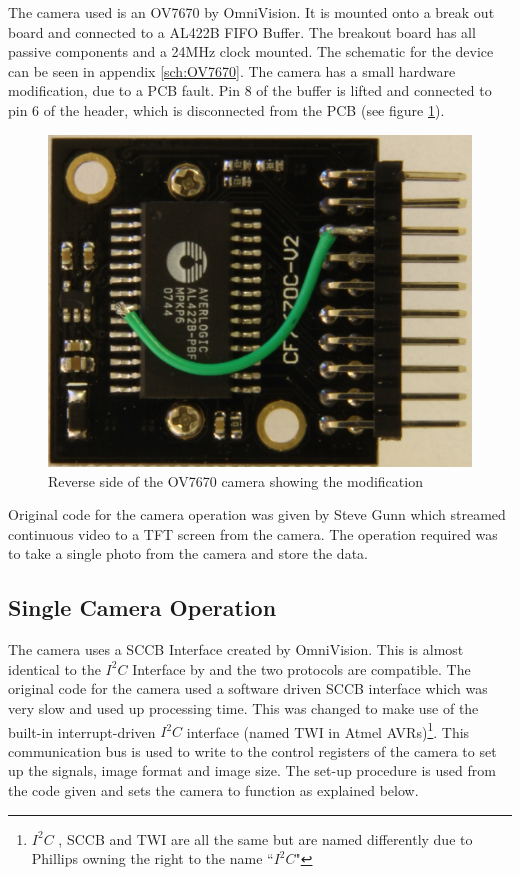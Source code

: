 The camera used is an OV7670 by OmniVision. It is mounted onto a break out board and connected to a AL422B FIFO Buffer. The breakout board has all passive components and a 24MHz clock mounted. The schematic for the device can be seen in appendix \ref{sch:OV7670}. The camera has a small hardware modification, due to a PCB fault. Pin 8 of the buffer is lifted and connected to pin 6 of the header, which is disconnected from the PCB (see figure \ref{fig:OV7670:Mod}).
\begin{figure}
\centering
\includegraphics[width=\textwidth /4]{Figures/OV7670_Back.jpg}
\caption{Reverse side of the OV7670 camera showing the modification}
\label{fig:OV7670:Mod}
\end{figure}
Original code for the camera operation was given by Steve Gunn which streamed continuous video to a TFT screen from the camera. The operation required was to take a single photo from the camera and store the data. 

\subsection{Single Camera Operation}

The camera uses a SCCB Interface \citep{SCCB_Interface} created by OmniVision. This is almost identical to the $I^{2}C$ Interface by \cite{Philips:I2C} and the two protocols are compatible. The original code for the camera used a software driven SCCB interface which was very slow and used up processing time. This was changed to make use of the built-in interrupt-driven $I^{2}C$ interface (named TWI in Atmel AVRs)\footnote{$I^{2}C$ , SCCB and TWI are all the same but are named differently due to Phillips owning the right to the name ``$I^{2}C$"}. This communication bus is used to write to the control registers of the camera to set up the signals, image format and image size. The set-up procedure is used from the code given and sets the camera to function as explained below.

